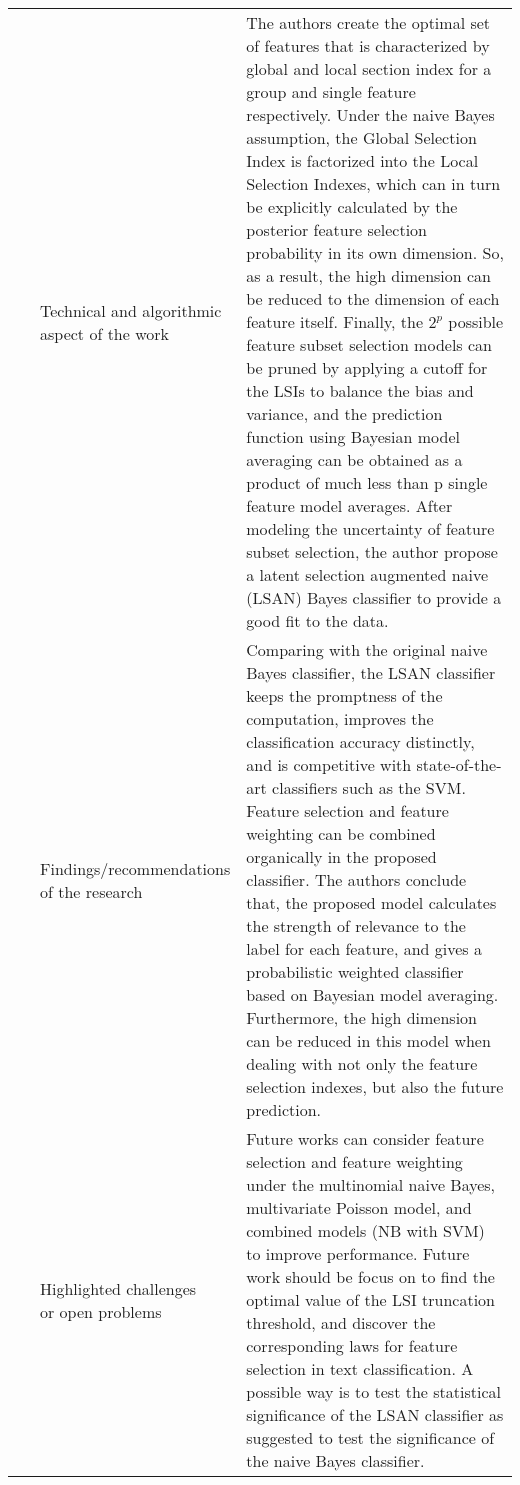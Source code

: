 \begin{landscape}
\begin{longtable}{lp{}p{}}
	\multirow{3}[0]{*}{~\citep{Feng2015}} & 
    \specialcell{Technical and algorithmic \\ aspect of the work} &
	The authors create the optimal set of features that is characterized by global and local section index for a group and single feature respectively. Under the naive Bayes assumption, the Global Selection Index is factorized into the Local Selection Indexes, which can in turn be explicitly calculated by the posterior feature selection probability in its own dimension. So, as a result, the high dimension can be reduced to the dimension of each feature itself. Finally, the $2^p$ possible feature subset selection models can be pruned by applying a cutoff for the LSIs to balance the bias and variance, and the prediction function using Bayesian model averaging can be obtained as a product of much less than p single feature model averages. After modeling the uncertainty of feature subset selection, the author propose a latent selection augmented naive (LSAN) Bayes classifier to provide a good fit to the data.     
    \\ & 
    \specialcell{Findings/recommendations \\ of the research} & 
	Comparing with the original naive Bayes classifier, the LSAN classifier keeps the promptness of the computation, improves the classification accuracy distinctly, and is competitive with state-of-the-art classifiers such as the SVM. Feature selection and feature weighting can be combined organically in the proposed classifier. The authors conclude that, the proposed model calculates the strength of relevance to the label for each feature, and gives a probabilistic weighted classifier based on Bayesian model averaging. Furthermore, the high dimension can be reduced in this model when dealing with not only the feature selection indexes, but also the future prediction.
    \\ & 
    \specialcell{Highlighted challenges \\ or open problems} & 
    Future works can consider feature selection and feature weighting under the multinomial naive Bayes, multivariate Poisson model, and combined models (NB with SVM) to improve performance. Future work should be focus on to find the optimal value of the LSI truncation threshold, and discover the corresponding laws for feature selection in text classification. A possible way is to test the statistical significance of the LSAN classifier as suggested to test the significance of the naive Bayes classifier.
	\\
	

\end{longtable}
\end{landscape}
